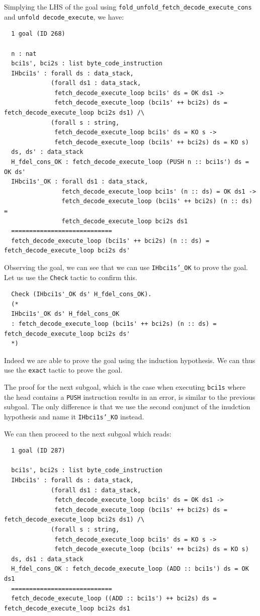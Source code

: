 \documentclass{article}
\begin{document}
Simplying the LHS of the goal using \texttt{fold\_unfold\_fetch\_decode\_execute\_cons} and \texttt{unfold decode\_execute}, we have:

\begin{lstlisting}
  1 goal (ID 268)
  
  n : nat
  bci1s', bci2s : list byte_code_instruction
  IHbci1s' : forall ds : data_stack,
             (forall ds1 : data_stack,
              fetch_decode_execute_loop bci1s' ds = OK ds1 ->
              fetch_decode_execute_loop (bci1s' ++ bci2s) ds = fetch_decode_execute_loop bci2s ds1) /\
             (forall s : string,
              fetch_decode_execute_loop bci1s' ds = KO s ->
              fetch_decode_execute_loop (bci1s' ++ bci2s) ds = KO s)
  ds, ds' : data_stack
  H_fdel_cons_OK : fetch_decode_execute_loop (PUSH n :: bci1s') ds = OK ds'
  IHbci1s'_OK : forall ds1 : data_stack,
                fetch_decode_execute_loop bci1s' (n :: ds) = OK ds1 ->
                fetch_decode_execute_loop (bci1s' ++ bci2s) (n :: ds) =
                fetch_decode_execute_loop bci2s ds1
  ============================
  fetch_decode_execute_loop (bci1s' ++ bci2s) (n :: ds) = fetch_decode_execute_loop bci2s ds'
\end{lstlisting}

Observing the goal, we can see that we can use \texttt{IHbci1s'\_OK} to prove the goal. Let us use the \texttt{Check} tactic to confirm this.

\begin{lstlisting}
  Check (IHbci1s'_OK ds' H_fdel_cons_OK).
  (*
  IHbci1s'_OK ds' H_fdel_cons_OK
  : fetch_decode_execute_loop (bci1s' ++ bci2s) (n :: ds) = fetch_decode_execute_loop bci2s ds'
  *)
\end{lstlisting}

Indeed we are able to prove the goal using the induction hypothesis. We can thus use the \texttt{exact} tactic to prove the goal.

The proof for the next subgoal, which is the case when executing \texttt{bci1s} where the head contains a \texttt{PUSH} instruction results in an error, is similar to the previous subgoal. The only difference is that we use the second conjunct of the inudction hypothesis and name it \texttt{IHbci1s'\_KO} instead.

We can then proceed to the next subgoal which reads:

\begin{lstlisting}
  1 goal (ID 287)
  
  bci1s', bci2s : list byte_code_instruction
  IHbci1s' : forall ds : data_stack,
             (forall ds1 : data_stack,
              fetch_decode_execute_loop bci1s' ds = OK ds1 ->
              fetch_decode_execute_loop (bci1s' ++ bci2s) ds = fetch_decode_execute_loop bci2s ds1) /\
             (forall s : string,
              fetch_decode_execute_loop bci1s' ds = KO s ->
              fetch_decode_execute_loop (bci1s' ++ bci2s) ds = KO s)
  ds, ds1 : data_stack
  H_fdel_cons_OK : fetch_decode_execute_loop (ADD :: bci1s') ds = OK ds1
  ============================
  fetch_decode_execute_loop ((ADD :: bci1s') ++ bci2s) ds = fetch_decode_execute_loop bci2s ds1
\end{lstlisting}
\end{document}
